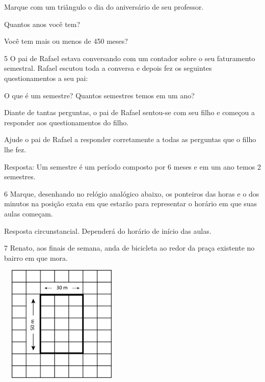 \begin{multicols}{2}
\begin{escolha}
\item
  Marque com um triângulo o dia do aniversário de seu professor.

\item
  Quantos anos você tem?

\item
  Você tem mais ou menos de 450 meses?
\end{escolha}

\num{5} O pai de Rafael estava conversando com um contador sobre o seu
faturamento semestral. Rafael escutou toda a conversa e depois fez os
seguintes questionamentos a seu pai:

O que é um semestre? 
Quantos semestres temos em um ano?

Diante de tantas perguntas, o pai de Rafael sentou-se com seu filho e
começou a responder aos questionamentos do filho.

Ajude o pai de Rafael a responder corretamente a todas as perguntas que o filho lhe fez.


Resposta:
Um semestre é um período composto por 6 meses e em um ano temos 2 semestres.

\num{6} Marque, desenhando no relógio analógico abaixo, os ponteiros das horas e o dos
minutos na posição exata em que estarão para representar o horário em que
suas aulas começam.



Resposta circunstancial. Dependerá do horário de início das aulas.


\num{7} Renato, aos finais de semana, anda de bicicleta ao redor da praça existente no bairro em que mora.


\includegraphics[width=2.35256in,height=2.20730in]{media/image55.png}


\end{multicols}
